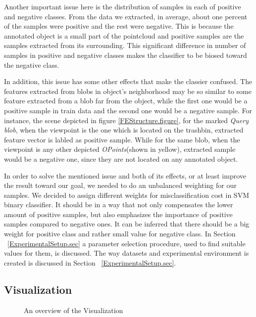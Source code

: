 Another important issue here is the distribution of samples in each of positive and negative classes. From the data we extracted, in average, about one percent of the samples were positive and the rest were negative. This is because the annotated object is a small part of the pointcloud and positive samples are the samples extracted from its surrounding. This significant difference in number of samples in positive and negative classes makes the classifier to be biosed toward the negative class. 


In addition, this issue has some other effects that make the classier confused. The features extracted from blobs in object's neighborhood may be so similar to some feature extracted from a blob far from the object, while the first one would be a positive sample in train data and the second one would be a negative sample. For instance, the scene depicted in figure \ref{FEStructure.figure}, for the marked {\it Query blob}, when the viewpoint is the one which is located on the trashbin, extracted feature vector is labled as positive sample. While for the same blob, when the viewpoint is any other depicted {\it OPoints}(shown in yellow), extracted sample would be a negative one, since they are not located on any annotated object. 


In order to solve the mentioned issue and both of its effects, or at least improve the result toward our goal, we needed to do an unbalanced weighting for our samples. We decided to assign different weights for misclassification cost in SVM binary classifier. It should be in a way that not only compensates the lower amount of positive samples, but also emphasizes the importance of positive samples compared to negative ones. It can be inferred that there should be a big weight for positive class and rather small value for negative class. In Section ~\ref{ExperimentalSetup.sec} a parameter selection procedure, used to find suitable values for them, is discussed. The way datasets and experimental environment is created is discussed in Section ~\ref{ExperimentalSetup.sec}.




\subsection{Visualization}
\label{visualization.ssec}

\begin{figure}[ht]
  \caption[Visualization overview]
  {An overview of the Visualization}
  \label{VisualizationFlowchart.figure}
\end{figure}

